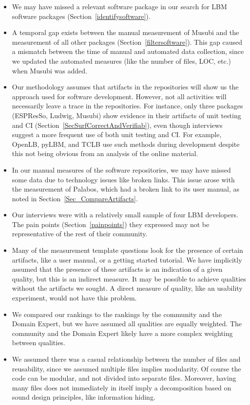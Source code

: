 \documentclass[final, 3p, times, authoryear]{elsarticle}
\begin{document}
\begin{itemize}
\item We may have missed a relevant software package in our search for LBM
software packages (Section~\ref{identifysoftware}).
\item A temporal gap exists between the manual measurement of Musubi and the
measurement of all other packages (Section~\ref{filtersoftware}). This gap
caused a mismatch between the time of manual and automated data collection,
since we updated the automated measures (like the number of files, LOC, etc.)
when Musubi was added.
\item Our methodology assumes that artifacts in the repositories will show us
the approach used for software development.  However, not all activities will
necessarily leave a trace in the repositories. For instance, only three packages
(ESPResSo, Ludwig, Musubi) show evidence in their artifacts of unit testing and
CI (Section~\ref{SecSurfCorrectAndVerifiab}), even though interviews suggest a
more frequent use of both unit testing and CI. For example, OpenLB, pyLBM, and
TCLB use such methods during development despite this not being obvious from an
analysis of the online material.
\item In our manual measures of the software repositories, we may have missed
some data due to technology issues like broken links. This issue arose with the
measurement of Palabos, which had a broken link to its user manual, as noted in
Section~\ref{Sec_CompareArtifacts}. 
\item Our interviews were with a relatively small sample of four LBM developers.
The pain points (Section~\ref{painpoints}) they expressed may not be
representative of the rest of their community.
\end{itemize}

\begin{itemize}
    \item Many of the measurement template questions look for the presence of
    certain artifacts, like a user manual, or a getting started tutorial.  We
    have implicitly assumed that the presence of these artifacts is an
    indication of a given quality, but this is an indirect measure.  It may be
    possible to achieve qualities without the artifacts we sought.  A direct
    measure of quality, like an usability experiment, would not have this
    problem.
    \item We compared our rankings to the rankings by the community and the
    Domain Expert, but we have assumed all qualities are equally weighted.  The
    community and the Domain Expert likely have a more complex weighting between
    qualities.
    \item We assumed there was a casual relationship between the number of files
    and reusability, since we assumed multiple files implies modularity.  Of
    course the code can be modular, and not divided into separate files.
    Moreover, having many files does not immediately in itself imply a
    decomposition based on sound design principles, like information hiding.
\end{itemize}
\end{document}
